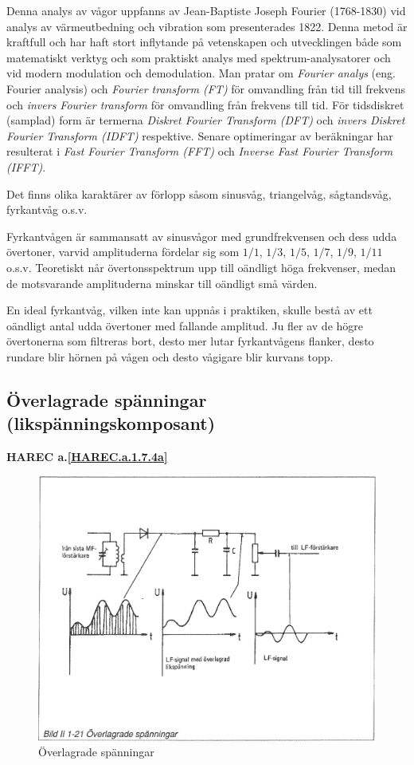 Denna analys av vågor uppfanns av Jean-Baptiste Joseph Fourier (1768-1830)
vid analys av värmeutbedning och vibration som presenterades 1822. Denna metod
är kraftfull och har haft stort inflytande på vetenskapen och utvecklingen
både som matematiskt verktyg och som praktiskt analys med spektrum-analysatorer
och vid modern modulation och demodulation. Man pratar om \emph{Fourier analys}
(eng. Fourier analysis) och \emph{Fourier transform (FT)} för omvandling från
tid till frekvens och \emph{invers Fourier transform} för omvandling från
frekvens till tid. För tidsdiskret (samplad) form är termerna
\emph{Diskret Fourier Transform (DFT)} och
\emph{invers Diskret Fourier Transform (IDFT)} respektive. Senare optimeringar
av beräkningar har resulterat i \emph{Fast Fourier Transform (FFT)} och
\emph{Inverse Fast Fourier Transform (IFFT)}.

Det finns olika karaktärer av förlopp såsom sinusvåg, triangelvåg, sågtandsvåg,
fyrkantvåg o.s.v.

Fyrkantvågen är sammansatt av sinusvågor med grundfrekvensen och dess udda
övertoner, varvid amplituderna fördelar sig som \(1/1\), \(1/3\), \(1/5\),
\(1/7\), \(1/9\), \(1/11\) o.s.v. Teoretiskt når övertonsspektrum upp till
oändligt höga frekvenser, medan de motsvarande amplituderna minskar till
oändligt små värden.

En ideal fyrkantvåg, vilken inte kan uppnås i praktiken, skulle bestå av ett
oändligt antal udda övertoner med fallande amplitud. Ju fler av de högre
övertonerna som filtreras bort, desto mer lutar fyrkantvågens flanker, desto
rundare blir hörnen på vågen och desto vågigare blir kurvans topp.

\subsection{Överlagrade spänningar
(likspänningskomposant)}
\textbf{HAREC a.\ref{HAREC.a.1.7.4a}\label{myHAREC.a.1.7.4a}}

\begin{figure}
\begin{center}
\includegraphics[width=14cm]{images/bild_2_1-21}
\caption{Överlagrade spänningar}
\label{fig:BildII1-21}
\end{center}
\end{figure}


